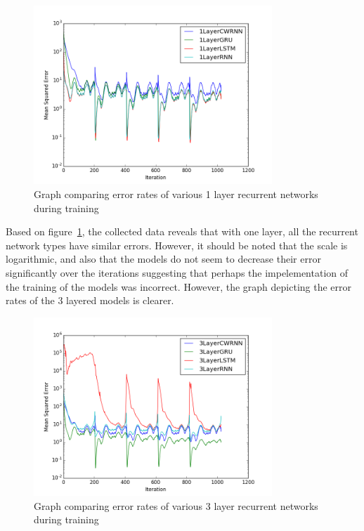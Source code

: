 \documentclass{article}
\begin{document}
\begin{figure}[H]
	\includegraphics[width=0.8\textwidth]{1LayerComparison.png}
	\caption{Graph comparing error rates of various 1 layer recurrent networks
	during training}
	\label{fig:1layer}
\end{figure}

Based on figure~\ref{fig:1layer}, the collected data reveals that with one
layer, all the recurrent network types have similar errors. However, it should
be noted that the scale is logarithmic, and also that the models do not seem to
decrease their error significantly over the iterations suggesting that perhaps
the impelementation of the training of the models was incorrect. However, the
graph depicting the error rates of the 3 layered models is clearer.

\begin{figure}[H]
	\includegraphics[width=0.8\textwidth]{3LayerComparison.png}
	\caption{Graph comparing error rates of various 3 layer recurrent networks
	during training}
	\label{fig:3layer}
\end{figure}
\end{document}
